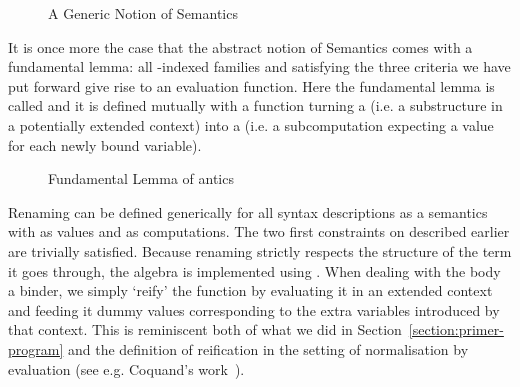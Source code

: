 \begin{figure}[h]
\begin{minipage}{0.45\textwidth}
\end{minipage}\hspace{2em}
\begin{minipage}{0.45\textwidth}
\end{minipage}
\caption{A Generic Notion of Semantics}
\end{figure}

It is once more the case that the abstract notion of Semantics comes
with a fundamental lemma: all -indexed families  and
 satisfying the three criteria we have put forward give rise
to an evaluation function. Here the fundamental lemma is called 
and it is defined mutually with a function  turning a 
(i.e. a substructure in a potentially extended context) into a 
(i.e. a subcomputation expecting a value for each newly bound variable).

\begin{figure}[h]
{\center {}}
\hspace{-1em}\begin{minipage}{0.40\textwidth}
\end{minipage}\hspace{2em}
\hspace{-1em}\begin{minipage}{0.50\textwidth}
\end{minipage}
\caption{Fundamental Lemma of antics}
\end{figure}

Renaming can be defined generically for all syntax descriptions as a
semantics with  as values and  as computations. The
two first constraints on  described earlier are trivially
satisfied. Because renaming strictly respects the structure of the
term it goes through, the algebra is implemented using .
When dealing with the body a binder, we simply `reify' the
 function by evaluating it in an extended context and
feeding it dummy values corresponding to the extra variables
introduced by that context. This is reminiscent both of what we
did in Section~\ref{section:primer-program} and the definition
of reification in the setting of normalisation by evaluation
(see e.g. Coquand's work~\citeyear{coquand2002formalised}).

